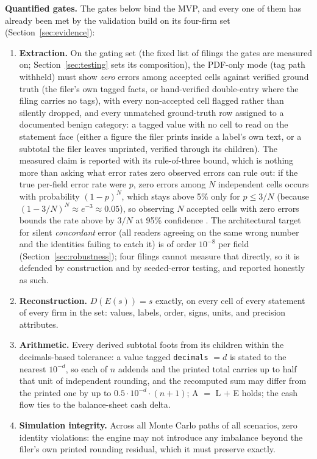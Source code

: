 \documentclass[11pt]{article}
\newcommand{\lead}[2]{\par\addvspace{5pt}\textbf{\textcolor{#1}{#2}}}
\begin{document}
\lead{navytwo}{Quantified gates.} The gates below bind the MVP, and every one of them has already been met by the validation build on its four-firm set (Section~\ref{sec:evidence}):
\begin{enumerate}
  \item \textbf{Extraction.} On the gating set (the fixed list of filings the gates are measured on; Section~\ref{sec:testing} sets its composition), the PDF-only mode (tag path withheld) must show \emph{zero} errors among accepted cells against verified ground truth (the filer's own tagged facts, or hand-verified double-entry where the filing carries no tags), with every non-accepted cell flagged rather than silently dropped, and every unmatched ground-truth row assigned to a documented benign category: a tagged value with no cell to read on the statement face (either a figure the filer prints inside a label's own text, or a subtotal the filer leaves unprinted, verified through its children). The measured claim is reported with its rule-of-three bound, which is nothing more than asking what error rates zero observed errors can rule out: if the true per-field error rate were $p$, zero errors among $N$ independent cells occurs with probability $(1-p)^N$, which stays above 5\% only for $p \le 3/N$ (because $(1-3/N)^N \approx e^{-3} \approx 0.05$), so observing $N$ accepted cells with zero errors bounds the rate above by $3/N$ at 95\% confidence \cite{ruleofthree}. The architectural target for silent \emph{concordant} error (all readers agreeing on the same wrong number and the identities failing to catch it) is of order $10^{-8}$ per field (Section~\ref{sec:robustness}); four filings cannot measure that directly, so it is defended by construction and by seeded-error testing, and reported honestly as such.
  \item \textbf{Reconstruction.} $D(E(s)) = s$ exactly, on every cell of every statement of every firm in the set: values, labels, order, signs, units, and precision attributes.
  \item \textbf{Arithmetic.} Every derived subtotal foots from its children within the decimals-based tolerance: a value tagged \texttt{decimals} $= d$ is stated to the nearest $10^{-d}$, so each of $n$ addends and the printed total carries up to half that unit of independent rounding, and the recomputed sum may differ from the printed one by up to $0.5 \cdot 10^{-d} \cdot (n+1)$; A $=$ L $+$ E holds; the cash flow ties to the balance-sheet cash delta.
  \item \textbf{Simulation integrity.} Across all Monte Carlo paths of all scenarios, zero identity violations: the engine may not introduce any imbalance beyond the filer's own printed rounding residual, which it must preserve exactly.

\end{enumerate}
\end{document}
